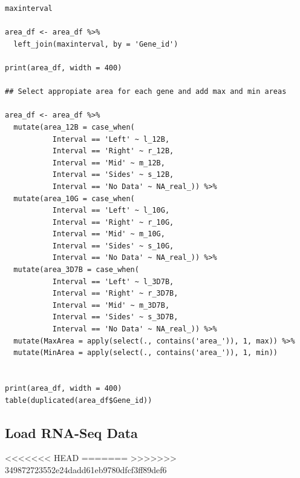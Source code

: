 \documentclass[11pt]{article}
\begin{document}
\begin{verbatim}
maxinterval

area_df <- area_df %>%
  left_join(maxinterval, by = 'Gene_id')

print(area_df, width = 400)

## Select appropiate area for each gene and add max and min areas

area_df <- area_df %>%
  mutate(area_12B = case_when(
           Interval == 'Left' ~ l_12B,
           Interval == 'Right' ~ r_12B,
           Interval == 'Mid' ~ m_12B,
           Interval == 'Sides' ~ s_12B,
           Interval == 'No Data' ~ NA_real_)) %>%
  mutate(area_10G = case_when(
           Interval == 'Left' ~ l_10G,
           Interval == 'Right' ~ r_10G,
           Interval == 'Mid' ~ m_10G,
           Interval == 'Sides' ~ s_10G,
           Interval == 'No Data' ~ NA_real_)) %>%
  mutate(area_3D7B = case_when(
           Interval == 'Left' ~ l_3D7B,
           Interval == 'Right' ~ r_3D7B,
           Interval == 'Mid' ~ m_3D7B,
           Interval == 'Sides' ~ s_3D7B,
           Interval == 'No Data' ~ NA_real_)) %>%
  mutate(MaxArea = apply(select(., contains('area_')), 1, max)) %>%
  mutate(MinArea = apply(select(., contains('area_')), 1, min))


print(area_df, width = 400)
table(duplicated(area_df$Gene_id))
\end{verbatim}
\subsection{Load RNA-Seq Data}
<<<<<<< HEAD
\label{sec:org637246a}
=======
\label{sec:org8bca27d}
>>>>>>> 349872723552e24dadd61eb9780dfcf3ff89def6
\end{document}
